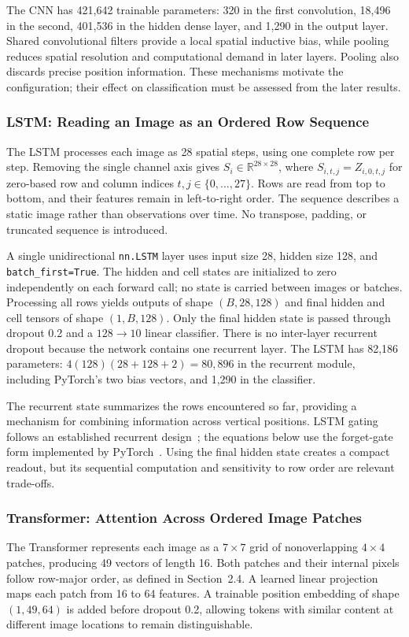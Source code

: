 The CNN has 421,642 trainable parameters: 320 in the first convolution,
18,496 in the second, 401,536 in the hidden dense layer, and 1,290 in the
output layer. Shared convolutional filters provide a local spatial inductive
bias, while pooling reduces spatial resolution and computational demand in
later layers. Pooling also discards precise position information. These
mechanisms motivate the configuration; their effect on classification must
be assessed from the later results.

\clearpage
\subsubsection{LSTM: Reading an Image as an Ordered Row Sequence}
The LSTM processes each image as 28 spatial steps, using one complete row per
step. Removing the single channel axis gives $S_i\in\mathbb{R}^{28\times28}$,
where $S_{i,t,j}=Z_{i,0,t,j}$ for zero-based row and column indices
$t,j\in\{0,\ldots,27\}$. Rows are read from top to bottom, and their features
remain in left-to-right order. The sequence describes a static image rather
than observations over time. No transpose, padding, or truncated sequence is
introduced.

A single unidirectional \texttt{nn.LSTM} layer uses input size 28, hidden
size 128, and \texttt{batch\_first=True}. The hidden and cell states are
initialized to zero independently on each forward call; no state is carried
between images or batches. Processing all rows yields outputs of shape
$(B,28,128)$ and final hidden and cell tensors of shape $(1,B,128)$.
Only the final hidden state is passed through dropout 0.2 and a $128\to10$
linear classifier. There is no inter-layer recurrent dropout because the
network contains one recurrent layer. The LSTM has 82,186 parameters:
$4(128)(28+128+2)=80{,}896$ in the recurrent module, including PyTorch's two
bias vectors, and 1,290 in the classifier.

The recurrent state summarizes the rows encountered so far, providing a
mechanism for combining information across vertical positions. LSTM gating
follows an established recurrent design~\cite{meth_lstm}; the equations below
use the forget-gate form implemented by PyTorch~\cite{meth_torch_lstm}.
Using the final hidden state creates a compact readout, but its sequential
computation and sensitivity to row order are relevant trade-offs.

\subsubsection{Transformer: Attention Across Ordered Image Patches}
The Transformer represents each image as a $7\times7$ grid of nonoverlapping
$4\times4$ patches, producing 49 vectors of length 16. Both patches and their
internal pixels follow row-major order, as defined in Section~2.4. A learned
linear projection maps each patch from 16 to 64 features. A trainable position
embedding of shape $(1,49,64)$ is added before dropout 0.2, allowing tokens
with similar content at different image locations to remain distinguishable.

